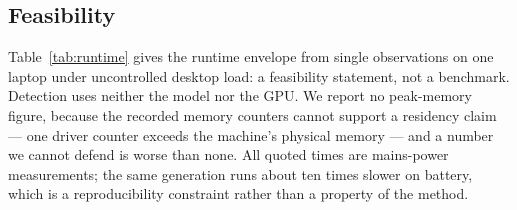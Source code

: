 \subsection{Feasibility}

Table~\ref{tab:runtime} gives the runtime envelope from single observations on one laptop under
uncontrolled desktop load: a feasibility statement, not a benchmark. Detection uses neither the model
nor the GPU. We report no peak-memory figure, because the recorded memory counters cannot support a
residency claim --- one driver counter exceeds the machine's physical memory --- and a number we cannot
defend is worse than none. All quoted times are mains-power measurements; the same generation runs about
ten times slower on battery, which is a reproducibility constraint rather than a property of the method.


